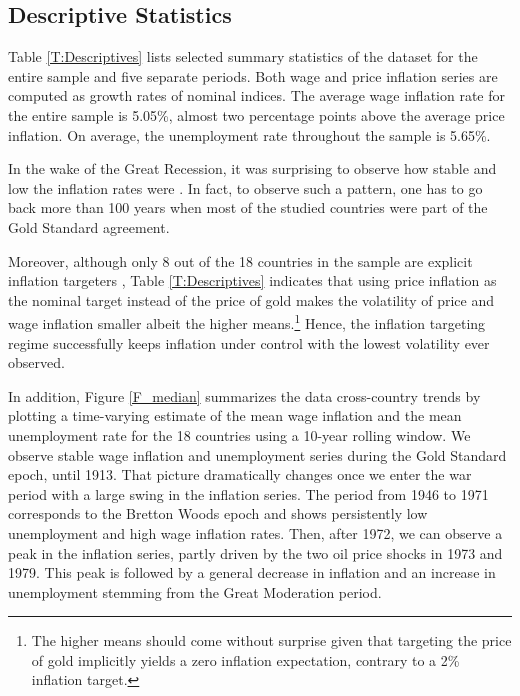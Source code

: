 \documentclass[12pt]{article}
\begin{document}

\subsection{Descriptive Statistics}

Table \ref{T:Descriptives} lists selected summary statistics of the dataset for the entire sample and five separate periods. Both wage and price inflation series are computed as growth rates of nominal indices. The average wage inflation rate for the entire sample is 5.05\%, almost two percentage points above the average price inflation. On average, the unemployment rate throughout the sample is 5.65\%.



In the wake of the Great Recession, it was surprising to observe how stable and low the inflation rates were \citep{Miles2017}. In fact, to observe such a pattern, one has to go back more than 100 years when most of the studied countries were part of the Gold Standard agreement.

Moreover, although only 8 out of the 18 countries in the sample are explicit inflation targeters \citep{Svensson2010}, Table \ref{T:Descriptives} indicates that using price inflation as the nominal target instead of the price of gold makes the volatility of price and wage inflation smaller albeit the higher means.\footnote{The higher means should come without surprise given that targeting the price of gold implicitly yields a zero inflation expectation, contrary to a 2\% inflation target.} Hence, the inflation targeting regime successfully keeps inflation under control with the lowest volatility ever observed.

In addition, Figure \ref{F_median} summarizes the data cross-country trends by plotting a time-varying estimate of the mean wage inflation and the mean unemployment rate for the 18 countries using a 10-year rolling window. We observe stable wage inflation and unemployment series during the Gold Standard epoch, until 1913. That picture dramatically changes once we enter the war period with a large swing in the inflation series. The period from 1946 to 1971 corresponds to the Bretton Woods epoch and shows persistently low unemployment and high wage inflation rates. Then, after 1972, we can observe a peak in the inflation series, partly driven by the two oil price shocks in 1973 and 1979. This peak is followed by a general decrease in inflation and an increase in unemployment stemming from the Great Moderation period.
\end{document}
